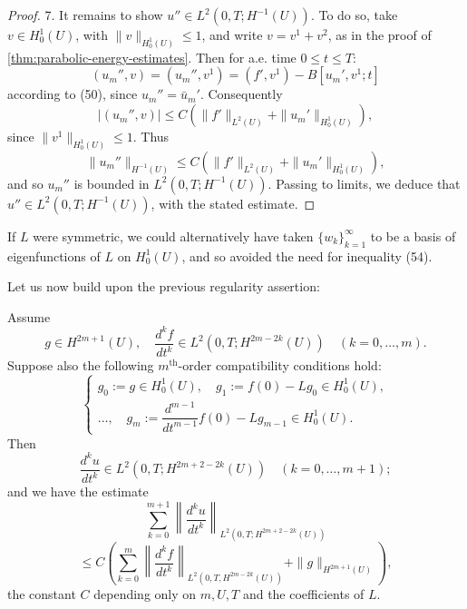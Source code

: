 \begin{proof}
7. It remains to show $u'' \in L^2(0, T; H^{-1}(U))$. To do so, take $v \in H_0^1(U)$, with $\|v\|_{H_0^1(U)} \leq 1$, and write $v = v^1 + v^2$, as in the proof of \cref{thm:parabolic-energy-estimates}. Then for a.e. time $0 \leq t \leq T$:
\[
(u_m'', v) = (u_m'', v^1) = (f', v^1) - B[u_m', v^1; t]
\]
according to (50), since $u_m'' = \bar u_m'$. Consequently
\[
|(u_m'', v)| \leq C(\|f'\|_{L^2(U)} + \|u_m'\|_{H_0^1(U)}),
\]
since $\|v^1\|_{H_0^1(U)} \leq 1$. Thus
\[
\|u_m''\|_{H^{-1}(U)} \leq C(\|f'\|_{L^2(U)} + \|u_m'\|_{H_0^1(U)}),
\]
and so $u_m''$ is bounded in $L^2(0, T; H^{-1}(U))$. Passing to limits, we deduce that $u'' \in L^2(0, T; H^{-1}(U))$, with the stated estimate.
\end{proof}

\begin{remark}
\label{rem:parabolic-regularity-symmetric-eigenfunctions}
If $L$ were symmetric, we could alternatively have taken $\{w_k\}_{k=1}^\infty$ to be a basis of eigenfunctions of $L$ on $H_0^1(U)$, and so avoided the need for inequality (54).
\end{remark}

Let us now build upon the previous regularity assertion:

\begin{theorem}
\label{thm:parabolic-higher-regularity}
Assume
\[
g \in H^{2m+1}(U), \quad \frac{d^k f}{dt^k} \in L^2(0,T; H^{2m-2k}(U)) \quad (k=0,\ldots,m).
\]
Suppose also the following $m^{\text{th}}$-order compatibility conditions hold:
\[
\begin{cases}
g_0 := g \in H^1_0(U), \quad g_1 := f(0) - Lg_0 \in H^1_0(U), \\
\ldots, \quad g_m := \dfrac{d^{m-1}}{dt^{m-1}}f(0) - Lg_{m-1} \in H^1_0(U).
\end{cases}
\]
Then
\[
\frac{d^k u}{dt^k} \in L^2(0,T; H^{2m+2-2k}(U)) \quad (k=0,\ldots,m+1);
\]
and we have the estimate
\[
\sum_{k=0}^{m+1} \left\| \frac{d^k u}{dt^k} \right\|_{L^2(0,T;H^{2m+2-2k}(U))}
\]
\[
\leq C \left( \sum_{k=0}^{m} \left\| \frac{d^k f}{dt^k} \right\|_{L^2(0,T,H^{2m-2k}(U))} + \|g\|_{H^{2m+1}(U)} \right),
\tag{55}
\]
the constant $C$ depending only on $m, U, T$ and the coefficients of $L$.
\end{theorem}

